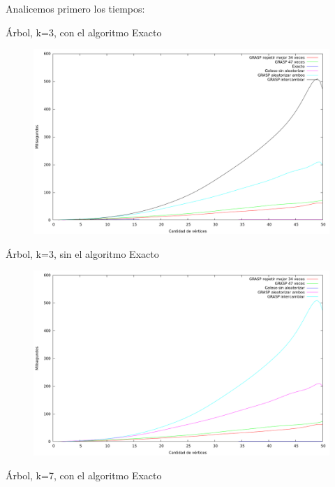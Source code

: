 Analicemos primero los tiempos:

Árbol, k=3, con el algoritmo Exacto

\begin{figure}[H]
  \begin{center}
    \includegraphics[scale=0.35]{imagenes/ej6-arbol-k3-tiempo-exacto.png}
  \end{center}
\end{figure}

Árbol, k=3, sin el algoritmo Exacto

\begin{figure}[H]
  \begin{center}
    \includegraphics[scale=0.35]{imagenes/ej6-arbol-k3-tiempo.png}
  \end{center}
\end{figure}

Árbol, k=7, con el algoritmo Exacto

